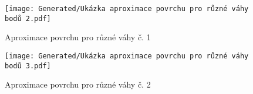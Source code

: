 \begin{imagepage}
    \begin{figure}[H]
        \centering
        \texttt{[image: Generated/Ukázka aproximace povrchu pro různé váhy bodů 2.pdf]}
        \caption{Aproximace povrchu pro různé váhy č. 1}
        \label{fig:Demo aproximace povrchu pro různé váhy č. 1}
    \end{figure}
    \begin{figure}[H]
        \centering
        \texttt{[image: Generated/Ukázka aproximace povrchu pro různé váhy bodů 3.pdf]}
        \caption{Aproximace povrchu pro různé váhy č. 2}
        \label{fig:Demo aproximace povrchu pro různé váhy č. 2}
    \end{figure}
\end{imagepage}
